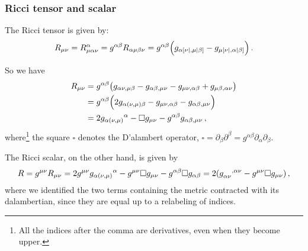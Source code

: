 \documentclass[main.tex]{subfiles}
\begin{document}
\subsubsection{Ricci tensor and scalar}

The Ricci tensor is given by: 
%
\begin{equation}
  R_{\mu \nu } = R^{\alpha }_{\mu \alpha \nu } 
  = g^{\alpha \beta }R_{\alpha \mu \beta \nu }
  = g^{\alpha \beta }\qty(g_{\alpha [\nu|, \mu | \beta ]} - g_{\mu [\nu|, \alpha | \beta ]})
\,.
\end{equation}
%


So we have 
%
\begin{subequations}
    \begin{align}
    R_{\mu \nu }
    &= g^{\alpha \beta }\qty(
      g_{\alpha \nu , \mu \beta }
      -g_{\alpha \beta , \mu \nu }
      - g_{\mu \nu , \alpha \beta }
      + g_{\mu \beta , \alpha \nu }
    )  \\
    &=g^{\alpha \beta }\qty(
      2 g_{\alpha (\nu , \mu ) \beta }
      - g_{\mu \nu , \alpha \beta }
      - g_{\alpha \beta , \mu \nu }
    )  \\
    &= 2 g_{\alpha (\nu , \mu )}\,\!^{\alpha } 
    - \square g_{\mu \nu }
    - g^{\alpha \beta }g_{\alpha \beta , \mu \nu }
    \label{eq:Ricci-tensor-LIF}
\,,
\end{align}
\end{subequations}
%
where\footnote{All the indices after the comma are derivatives, even when they become upper.} the square \(\square\) denotes the D'alambert operator, \(\square = \partial_{\beta }\partial^{\beta } = g^{\alpha \beta }\partial_{\alpha }\partial_{\beta }\).

The Ricci scalar, on the other hand, is given by 
%
\begin{equation} \label{eq:ricci-scalar-LIF} 
  R = g^{\mu \nu }R_{\mu \nu }
  = 2 g^{\mu \nu }g_{\alpha (\nu , \mu )}\,\!^{\alpha }
  -  g^{\mu \nu }\square g_{\mu \nu }
  - g^{\alpha \beta } \square g_{\alpha \beta }
  = 2 (\tensor{g}{_{\alpha \nu }^{, \alpha \nu }}
   -g^{\mu \nu } \square g_{\mu \nu })
\,,
\end{equation}
%
where we identified the two terms containing the metric contracted with its dalambertian, since they are equal up to a relabeling of indices.
\end{document}
